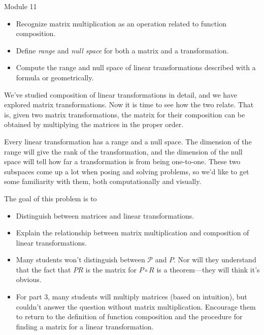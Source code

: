 \begin{lesson}

	Module 11

	\begin{itemize}
		\item Recognize matrix multiplication as an operation related to function composition.
		\item Define \emph{range} and \emph{null space} for both a matrix and a transformation.
		\item Compute the range and null space of linear transformations described
			with a formula or geometrically.
	\end{itemize}

		We've studied composition of linear transformations in detail, and we have explored
		matrix transformations. Now it is time to see how the two relate. That is, given
		two matrix transformations, the matrix for their composition can be obtained by
		multiplying the matrices in the proper order.

		Every linear transformation has a range and a null space. The dimension of the range
		will give the rank of the transformation, and the dimension of the null space
		will tell how far a transformation is from being one-to-one. These two subspaces come up
		a lot when posing and solving problems, so we'd like to get some familiarity with them,
		both computationally
		and visually.


\end{lesson}
	\question
	\begin{annotation}
		\begin{goals}

			The goal of this problem is to
			\begin{itemize}
				\item Distinguish between matrices and linear transformations.
				\item Explain the relationship between matrix multiplication and composition
					of linear transformations.
			\end{itemize}
		\end{goals}

		\begin{notes}
			\begin{itemize}
				\item Many students won't distinguish between $\mathcal P$ and $P$. Nor
					will they understand that the fact that $PR$ is the matrix for $P\circ R$
					is a theorem---they will think it's obvious.
				\item For part 3, many students will multiply matrices (based on intuition),
					but couldn't answer the question without matrix multiplication. Encourage
					them to return to the definition of function composition and the procedure
					for finding a matrix for a linear transformation.
			\end{itemize}
		\end{notes}
	\end{annotation}
